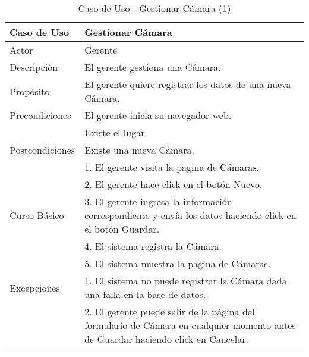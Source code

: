 \begin{longtable}{@{} p{3cm} p{11cm} @{}} \toprule
    \textbf{Caso de Uso}    & Gestionar Cámara \\ \midrule
    Actor                   & Gerente \\ \cmidrule{1-2}
    Descripción             & El gerente gestiona una Cámara. \\ \cmidrule{1-2}
    Propósito               & El gerente quiere registrar los datos de una nueva Cámara. \\ \cmidrule{1-2}
    Precondiciones          & El gerente inicia su navegador web. \\
                            & Existe el lugar. \\ \cmidrule{1-2} 
    Postcondiciones         & Existe una nueva Cámara. \\ \cmidrule{1-2} 
                            & 1. El gerente visita la página de Cámaras. \\ 
                            & 2. El gerente hace click en el botón Nuevo. \\
   Curso Básico             & 3. El gerente ingresa la información correspondiente y envía los datos haciendo click en el botón Guardar. \\
                            & 4. El sistema registra la Cámara. \\ 
                            & 5. El sistema muestra la página de Cámaras. \\ \cmidrule{1-2}
    Excepciones             & 1. El sistema no puede registrar la Cámara dada una falla en la base de datos. \\
                            & 2. El gerente puede salir de la página del formulario de Cámara en cualquier momento antes de Guardar haciendo click en Cancelar. \\ \bottomrule
   \caption{Caso de Uso - Gestionar Cámara (1)} \label{tab:tabcu-cam1} \\
   \end{longtable}


